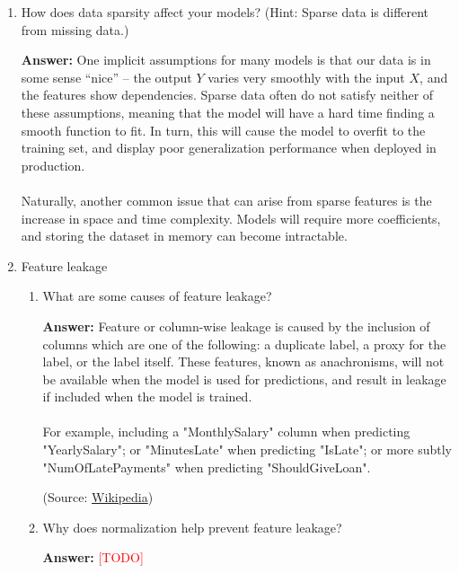 \documentclass{article}
\newenvironment{QandA}{\begin{enumerate}[label=\arabic*.]}{\end{enumerate}}
\newenvironment{InnerQandA}{\begin{enumerate}[label=\roman*.]}{\end{enumerate}}
\newenvironment{answer}{\par\normalfont \textbf{Answer:}}{}
\newcommand{\todo}{\textcolor{red}{[TODO]}}
\begin{document}
\begin{QandA}
    \item How does data sparsity affect your models? (Hint: Sparse data is different from missing data.)
    \begin{answer}
        One implicit assumptions for many models is that our data is in some sense ``nice'' -- the output $Y$ varies very smoothly with the input $X$, and the features show dependencies. Sparse data often do not satisfy neither of these assumptions, meaning that the model will have a hard time finding a smooth function to fit. In turn, this will cause the model to overfit to the training set, and display poor generalization performance when deployed in production. \\\\
        Naturally, another common issue that can arise from  sparse features is the increase in space and time complexity. Models will require more coefficients, and storing the dataset in memory can become intractable. 
    \end{answer}

    \item Feature leakage
    \begin{InnerQandA}
        \item What are some causes of feature leakage?
        \begin{answer}
            Feature or column-wise leakage is caused by the inclusion of columns which are one of the following: a duplicate label, a proxy for the label, or the label itself. These features, known as anachronisms, will not be available when the model is used for predictions, and result in leakage if included when the model is trained. \\\\
            For example, including a "MonthlySalary" column when predicting "YearlySalary"; or "MinutesLate" when predicting "IsLate"; or more subtly "NumOfLatePayments" when predicting "ShouldGiveLoan".

            (Source: \href{https://en.wikipedia.org/wiki/Leakage_(machine_learning)}{Wikipedia})
        \end{answer}

        \item Why does normalization help prevent feature leakage?
        \begin{answer}
            \todo 
        \end{answer}


\end{InnerQandA}
\end{QandA}
\end{document}
